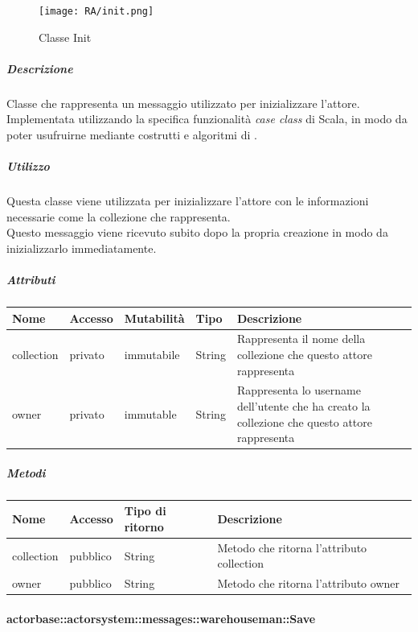\documentclass{scalatekids-article}
\begin{document}
\begin{figure}[H]
  \begin{center}
    \texttt{[image: RA/init.png]}
    \caption{Classe Init}
  \end{center}
\end{figure}

\subparagraph{Descrizione}
Classe che rappresenta un messaggio utilizzato per inizializzare l'attore.\\Implementata utilizzando la specifica funzionalità \textit{case class} di Scala,
in modo da poter usufruirne mediante costrutti e algoritmi di
.

\subparagraph{Utilizzo}
Questa classe viene utilizzata per inizializzare l'attore con le informazioni
necessarie come la collezione che rappresenta.\\Questo messaggio viene
ricevuto subito dopo la propria creazione in modo da inizializzarlo immediatamente.

\subparagraph{Attributi}
\begin{tabular}{| p{2cm} | p{1.5cm} | p{2cm} | p{3cm} | p{8.5cm} |}
  \hline
  Nome & Accesso & Mutabilità & Tipo & Descrizione\\
  \hline
  collection & privato & immutabile & String & Rappresenta il nome della collezione che questo attore rappresenta\\
  \hline
  owner & privato & immutable & String & Rappresenta lo username dell'utente che ha creato la collezione che questo attore rappresenta\\
  \hline
\end{tabular}

\subparagraph{Metodi}
\begin{tabular}{| p{3cm} | p{1.5cm} | p{3.5cm} | p{9cm} |}
  \hline
  Nome & Accesso & Tipo di ritorno & Descrizione\\
  \hline
  collection & pubblico & String & Metodo che ritorna l'attributo collection\\
  \hline
  owner & pubblico & String & Metodo che ritorna l'attributo owner\\
  \hline
\end{tabular}

\paragraph{actorbase::actorsystem::messages::warehouseman::Save}
\label{sec:actorbase::actorsystem::messages::warehouseman::Save}
\end{document}
